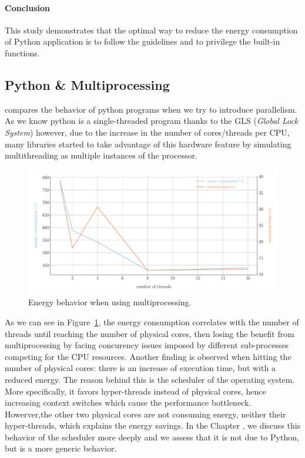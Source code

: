 \paragraph{Conclusion}
This study demonstrates that the optimal way to reduce the energy consumption of Python application is to follow the guidelines and to privilege the built-in functions.


\subsection{Python \& Multiprocessing}
 compares the behavior of python programs when we try to introduce parallelism.
As we know python is a single-threaded program thanks to the GLS (\emph{Global Lock System}) however, due to the increase in the number of cores/threads per CPU, many libraries started to take advantage of this hardware feature by simulating multithreading as multiple instances of the processor. %

\begin{figure}[hbt]
    \centering
    \includegraphics[width=\linewidth]{imgs/multiprocessing_energyvstime}
    \caption{Energy behavior when using multiprocessing.}
    \label{fig:python_multiprocessing}
\end{figure}

As we can see in Figure~\ref{fig:python_multiprocessing}, the energy consumption correlates with the number of threads until reaching the number of physical cores, then losing the benefit from multiprocessing by facing concurency issues imposed by different sub-processes competing for the CPU resources.
Another finding is observed when hitting the number of physical cores: there is an increase of execution time, but with a reduced energy.
The reason behind this is the scheduler of the operating system.
More specifically, it favors hyper-threads instead of physical cores, hence increasing context switches which cause the performance bottleneck.
Howerver,the other two physical cores are not consuming energy, neither their hyper-threads, which explains the energy savings.
In the Chapter , %
we discuss this behavior of the scheduler more deeply and we assess that it is not due to Python, but is a more generic behavior. %

